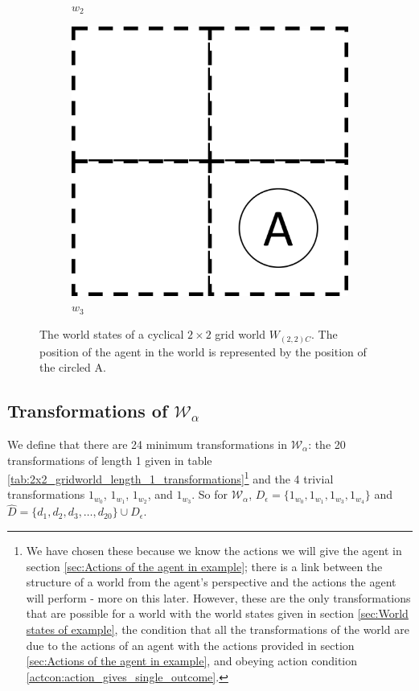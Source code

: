 \begin{figure}[H]
\begin{subfigure}[b]{0.45\linewidth}
		\caption{$w_{2}$}
	\end{subfigure}
	\begin{subfigure}[b]{0.45\linewidth}
		\centering
		\includegraphics[width=0.5\linewidth]{2MathematicalFramework/Images/2x2_no_walls_world_states/w3.png}
		\caption{$w_{3}$}
	\end{subfigure}
	\caption{
		The world states of a cyclical $2\times 2$ grid world $W_{(2,2)C}$.
		The position of the agent in the world is represented by the position of the circled A.
	}
	\label{fig:2x2-cyclical-grid-world-states}
\end{figure}

\subsection{Transformations of $\mathscr{W}_{\alpha}$}

We define that there are 24 minimum transformations in $\mathscr{W}_{\alpha}$: the 20 transformations of length 1 given in table \ref{tab:2x2_gridworld_length_1_transformations}\footnote{
	We have chosen these because we know the actions we will give the agent in section \ref{sec:Actions of the agent in example}; there is a link between the structure of a world from the agent's perspective and the actions the agent will perform - more on this later.
	However, these are the only transformations that are possible for a world with the world states given in section \ref{sec:World states of example}, the condition that all the transformations of the world are due to the actions of an agent with the actions provided in section \ref{sec:Actions of the agent in example}, and obeying action condition \ref{actcon:action_gives_single_outcome}.
}
and the 4 trivial transformations $1_{w_{0}}$, $1_{w_{1}}$, $1_{w_{2}}$, and $1_{w_{3}}$.
So for $\mathscr{W}_{\alpha}$, $D_{\epsilon} = \{ 1_{w_{0}}, 1_{w_{1}}, 1_{w_{3}}, 1_{w_{4}} \}$ and $\hat{D} = \{ d_{1}, d_{2}, d_{3}, \dots, d_{20} \} \cup D_{\epsilon}$.

